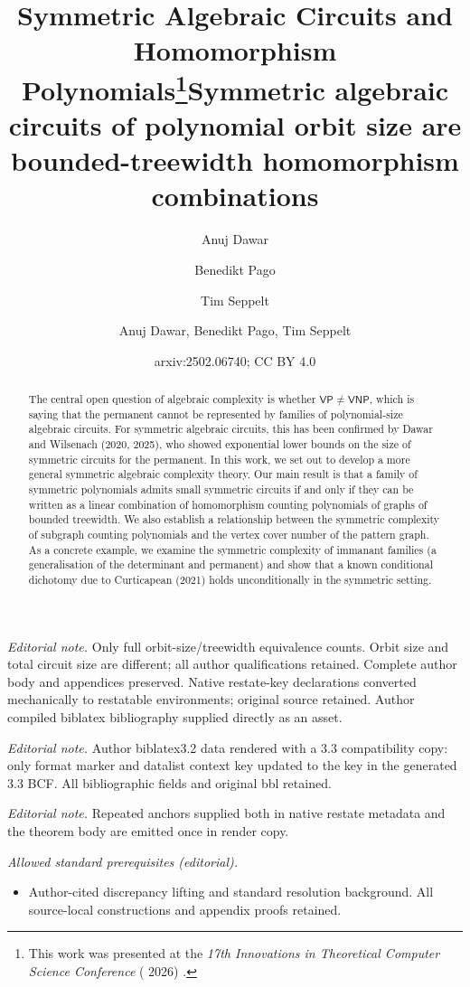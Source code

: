 \documentclass[10pt,a4paper]{article}
\title{Symmetric Algebraic Circuits and \\ Homomorphism Polynomials\footnote{This work was presented at the \emph{17th Innovations in Theoretical Computer Science Conference} (\textsmaller{ITCS} 2026) \cite{conference_version}.}}
\author{Anuj Dawar \orcidlink{0000-0003-4014-8248} \and Benedikt Pago \orcidlink{0000-0001-6377-1230} \and Tim Seppelt \orcidlink{0000-0002-6447-0568}}
\title{Symmetric algebraic circuits of polynomial orbit size are bounded-treewidth homomorphism combinations}
\author{Anuj Dawar, Benedikt Pago, Tim Seppelt}
\date{arxiv:2502.06740; CC BY 4.0}
\theoremstyle{definition}
\theoremstyle{plain}
\theoremstyle{remark}
\newcommand{\VP}{\mathsf{VP}}
\newcommand{\VNP}{\mathsf{VNP}}
\begin{document}
\maketitle
\noindent\textit{Editorial note.} Only full orbit-size/treewidth equivalence counts. Orbit size and total circuit size are different; all author qualifications retained. Complete author body and appendices preserved. Native restate-key declarations converted mechanically to restatable environments; original source retained. Author compiled biblatex bibliography supplied directly as an asset.\par\medskip
\noindent\textit{Editorial note.} Author biblatex3.2 data rendered with a 3.3 compatibility copy: only format marker and datalist context key updated to the key in the generated 3.3 BCF. All bibliographic fields and original bbl retained.\par\medskip
\noindent\textit{Editorial note.} Repeated anchors supplied both in native restate metadata and the theorem body are emitted once in render copy.\par\medskip
\noindent\textit{Allowed standard prerequisites (editorial).}\begin{itemize}
\item Author-cited discrepancy lifting and standard resolution background. All source-local constructions and appendix proofs retained.
\end{itemize}\medskip
	\maketitle

\begin{abstract}
	The central open question of algebraic complexity is whether $\VP \neq \VNP$, which is saying that the permanent cannot be represented by families of polynomial-size algebraic circuits. 
	For symmetric algebraic circuits, this has been confirmed by Dawar and Wilsenach (2020, 2025), who showed exponential lower bounds on the size of symmetric circuits for the permanent. In this work, we set out to develop a more general symmetric algebraic complexity theory. Our main result is that a family of symmetric polynomials admits small symmetric circuits if and only if they can be written as a linear combination of homomorphism counting polynomials of graphs of bounded treewidth. We also establish a relationship between the symmetric complexity of subgraph counting polynomials and the vertex cover number of the pattern graph. As a concrete example, we examine the symmetric complexity of immanant families (a generalisation of the determinant and permanent) and show that a known conditional dichotomy due to Curticapean (2021) holds unconditionally in the symmetric setting. 
\end{abstract}	
\end{document}

